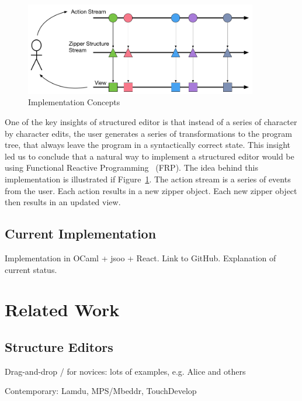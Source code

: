 \documentclass{llncs}
\begin{document}
\begin{figure}
\centering
\includegraphics[width=4in]{Implementation_Diagram}
\caption{Implementation Concepts}
\label{fig:FRP}
\end{figure}

One of the key insights of structured editor is that instead of a series of character by character edits, the user generates a series of transformations to the program tree, that always leave the program in a syntactically correct state.  This insight led us to conclude that a natural way to implement a structured editor would be using
Functional Reactive Programming~\cite{Wan:2000:FRP:349299.349331} (FRP).
The idea behind this implementation is illustrated if Figure~\ref{fig:FRP}.  The action stream is a series of events from the user.
Each action results in a new zipper object.  Each new zipper object then results in an updated view.



\subsection{Current Implementation}

Implementation in OCaml + jsoo + React. Link to GitHub. Explanation of current status.






\section{Related Work}
\subsection{Structure Editors}
Drag-and-drop / for novices: lots of examples, e.g. Alice and others

Contemporary: Lamdu, MPS/Mbeddr, TouchDevelop
\end{document}
